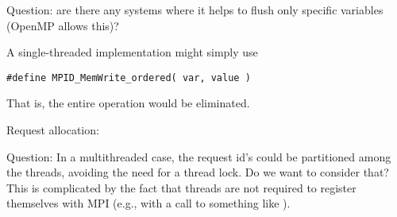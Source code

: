 Question: are there any systems where it helps to flush only
specific variables  (OpenMP allows this)?

A single-threaded implementation might simply use
\begin{verbatim}
#define MPID_MemWrite_ordered( var, value ) 
\end{verbatim}
That is, the entire operation would be eliminated.

Request allocation:

Question: In a multithreaded case, the request id's could be partitioned
among the threads, avoiding the need for a thread lock.  Do we want to
consider that?  This is complicated by the fact that threads are not
required to register themselves with MPI (e.g., with a call to something
like ).



